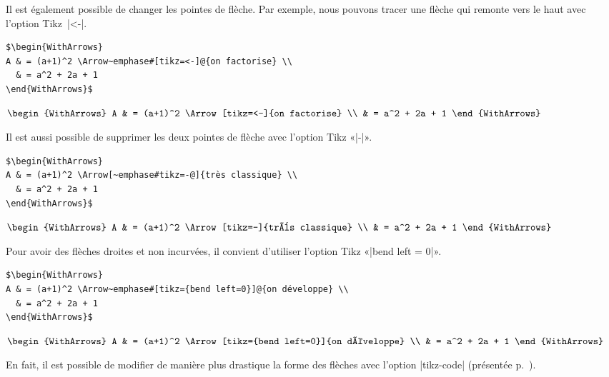 \documentclass[dvipsnames]{article}%
\def\interitem{\vspace{7mm plus 2 mm minus 3mm}}
\begin{document}
\interitem
Il est également possible de changer les pointes de flèche. Par exemple, nous pouvons tracer une flèche
qui remonte vers le haut avec l'option Tikz~|<-|.\label{Backwards} 

\begin{Verbatim}
$\begin{WithArrows}
A & = (a+1)^2 \Arrow~emphase#[tikz=<-]@{on factorise} \\
  & = a^2 + 2a + 1 
\end{WithArrows}$
\end{Verbatim}

$\begin{WithArrows}
A & = (a+1)^2 \Arrow[tikz=<-]{on factorise} \\
  & = a^2 + 2a + 1 
\end{WithArrows}$

\interitem
Il est aussi possible de supprimer les deux pointes de flèche avec l'option Tikz «|-|».\par\nobreak
\begin{Verbatim}
$\begin{WithArrows}
A & = (a+1)^2 \Arrow[~emphase#tikz=-@]{très classique} \\
  & = a^2 + 2a + 1 
\end{WithArrows}$
\end{Verbatim}

$\begin{WithArrows}
A & = (a+1)^2 \Arrow[tikz=-]{très classique} \\
  & = a^2 + 2a + 1 
\end{WithArrows}$

\interitem
Pour avoir des flèches droites et non incurvées, il convient d'utiliser l'option Tikz 
«|bend left = 0|».
\begin{Verbatim}
$\begin{WithArrows}
A & = (a+1)^2 \Arrow~emphase#[tikz={bend left=0}]@{on développe} \\
  & = a^2 + 2a + 1 
\end{WithArrows}$
\end{Verbatim}

$\begin{WithArrows}
A & = (a+1)^2 \Arrow[tikz={bend left=0}]{on développe} \\
  & = a^2 + 2a + 1 
\end{WithArrows}$

\smallskip 
En fait, il est possible de modifier de manière plus drastique la forme des flèches avec l'option
|tikz-code| (présentée p.~\pageref{tikz-code}).
\end{document}
